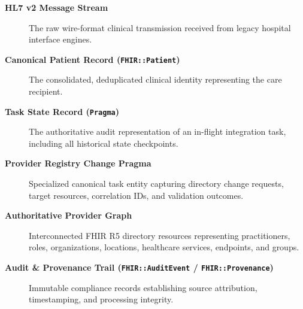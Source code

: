 \begin{description}
    \item[\textbf{HL7 v2 Message Stream}] The raw wire-format clinical transmission received from legacy hospital interface engines.
    \item[\textbf{Canonical Patient Record (\texttt{FHIR::Patient})}] The consolidated, deduplicated clinical identity representing the care recipient.
    \item[\textbf{Task State Record (\texttt{Pragma})}] The authoritative audit representation of an in-flight integration task, including all historical state checkpoints.
    \item[\textbf{Provider Registry Change Pragma}] Specialized canonical task entity capturing directory change requests, target resources, correlation IDs, and validation outcomes.
    \item[\textbf{Authoritative Provider Graph}] Interconnected FHIR R5 directory resources representing practitioners, roles, organizations, locations, healthcare services, endpoints, and groups.
    \item[\textbf{Audit \& Provenance Trail (\texttt{FHIR::AuditEvent} / \texttt{FHIR::Provenance})}] Immutable compliance records establishing source attribution, timestamping, and processing integrity.
\end{description}

\newpage

